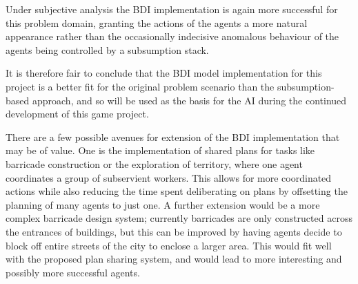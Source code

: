 \documentclass[a4paper,12pt]{article}
\begin{document}
Under subjective analysis the BDI implementation is again more successful for this problem domain, granting the actions of the agents a more natural appearance rather than the occasionally indecisive anomalous behaviour of the agents being controlled by a subsumption stack.

It is therefore fair to conclude that the BDI model implementation for this project is a better fit for the original problem scenario than the subsumption-based approach, and so will be used as the basis for the AI during the continued development of this game project.

There are a few possible avenues for extension of the BDI implementation that may be of value. One is the implementation of shared plans for tasks like barricade construction or the exploration of territory, where one agent coordinates a group of subservient workers. This allows for more coordinated actions while also reducing the time spent deliberating on plans by offsetting the planning of many agents to just one. A further extension would be a more complex barricade design system; currently barricades are only constructed across the entrances of buildings, but this can be improved by having agents decide to block off entire streets of the city to enclose a larger area. This would fit well with the proposed plan sharing system, and would lead to more interesting and possibly more successful agents.


\end{document}
